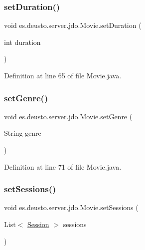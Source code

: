 \subsubsection{\texorpdfstring{setDuration()}{setDuration()}}
{\footnotesize\ttfamily void es.\+deusto.\+server.\+jdo.\+Movie.\+set\+Duration (\begin{DoxyParamCaption}\item[{int}]{duration }\end{DoxyParamCaption})}



Definition at line 65 of file Movie.\+java.

\mbox{\label{classes_1_1deusto_1_1server_1_1jdo_1_1_movie_aae8757b5e3229b6b521a0b8dab606eff}} 
\subsubsection{\texorpdfstring{setGenre()}{setGenre()}}
{\footnotesize\ttfamily void es.\+deusto.\+server.\+jdo.\+Movie.\+set\+Genre (\begin{DoxyParamCaption}\item[{String}]{genre }\end{DoxyParamCaption})}



Definition at line 71 of file Movie.\+java.

\mbox{\label{classes_1_1deusto_1_1server_1_1jdo_1_1_movie_a76eb3668db335d824abc947053584699}} 
\subsubsection{\texorpdfstring{setSessions()}{setSessions()}}
{\footnotesize\ttfamily void es.\+deusto.\+server.\+jdo.\+Movie.\+set\+Sessions (\begin{DoxyParamCaption}\item[{List$<$ \mbox{\hyperlink{classes_1_1deusto_1_1server_1_1jdo_1_1_session}{Session}} $>$}]{sessions }\end{DoxyParamCaption})}



